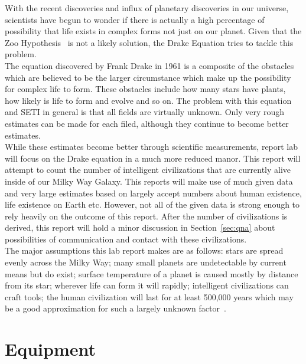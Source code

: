\documentclass{article}
\begin{document}
With the recent discoveries and influx of planetary
discoveries in our universe, scientists have begun to wonder if there is actually a high percentage of possibility that life exists in complex
forms not just on our planet.  Given that the Zoo Hypothesis~\cite{Ball:1973} is not a likely solution, the Drake Equation tries to tackle this problem.\\

The equation discovered by Frank Drake in 1961 is a composite of the obstacles which are believed to be the larger circumstance which make
up the possibility for complex life to form. These obstacles include how many stars have plants, how likely is life to form and evolve and so
on. The problem with this equation and SETI in general is that all fields are virtually unknown. Only very rough estimates can be made for
each filed, although they continue to become better estimates.\\

While these estimates become better through scientific measurements, report lab will focus on the Drake equation in a much more reduced
manor. This report will attempt to count the number of intelligent civilizations that are currently alive inside of our Milky Way Galaxy. This reports
will make use of much given data and very large estimates based on largely accept numbers about human existence, life existence on Earth etc.
However, not all of the given data is strong enough to rely heavily on the outcome of this report. After the number of civilizations is derived, this
report will hold a minor discussion in Section~\ref{sec:qna} about possibilities of communication and contact with these civilizations.\\

The major assumptions this lab report makes are as follows: stars are spread evenly across the Milky Way; many small planets are undetectable
by current means but do exist; surface temperature of a planet is caused mostly by distance from its star; wherever life can form it will rapidly;
intelligent civilizations can craft tools; the human civilization will last for at least 500,000 years which may be a good approximation for such
a largely unknown factor~\cite{nova:2010}.


\section{Equipment}
\end{document}
